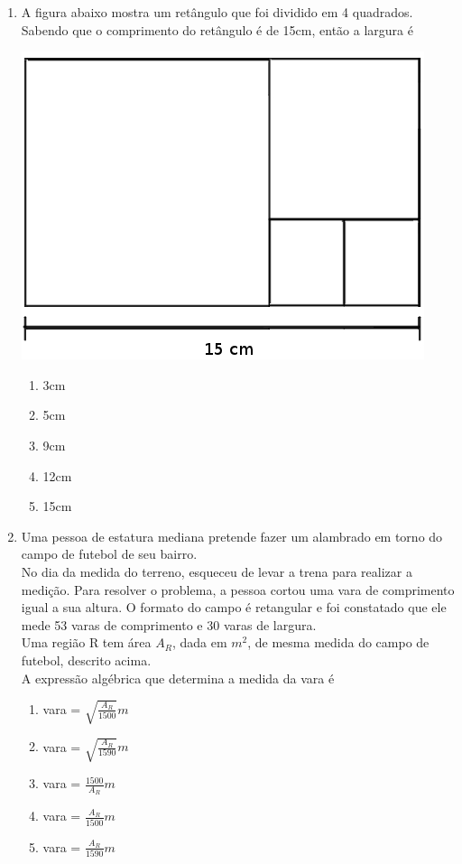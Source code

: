 \documentclass[10pt,a4paper]{article}
\newenvironment{Figure}
  {\par\medskip\noindent\minipage{\linewidth}}
  {\endminipage\par\medskip}
\begin{document}
\begin{multicols}{2}
\begin{enumerate}
	\item A figura abaixo mostra um ret\^angulo que foi dividido em 4 quadrados. Sabendo que o comprimento do ret\^angulo \'e de 15cm, ent\~ao a largura \'e

\begin{Figure}
     \centering
     \includegraphics[width=\linewidth]{retangulo_quadrado_matematica.jpg}
\end{Figure}


		\begin{enumerate}
		\item 3cm
		\item 5cm
		\item 9cm
		\item 12cm
		\item 15cm
		\end{enumerate}



	\item Uma pessoa de estatura mediana pretende fazer um alambrado em torno do campo de futebol de seu bairro. \\
	 No dia da medida do terreno, esqueceu de levar a trena para realizar a medi\c{c}\~ao. Para resolver o problema, a pessoa cortou uma vara de comprimento igual a sua altura. O formato do campo \'e retangular e foi constatado que ele mede 53 varas de comprimento e 30 varas de largura.\\
Uma regi\~ao R tem \'area $A_R$, dada em $m^2$, de mesma medida do campo de futebol, descrito acima. \\
A express\~ao alg\'ebrica que determina a medida da vara \'e 
		\begin{enumerate}
		\item vara = $\sqrt{\frac{A_R}{1500}}m$
		\item vara = $\sqrt{\frac{A_R}{1590}}m$
		\item vara = $\frac{1500}{A_R}m$
		\item vara = $\frac{A_R}{1500}m$
		\item vara = $\frac{A_R}{1590}m$
		\end{enumerate}




\end{enumerate}
\end{multicols}
\end{document}
